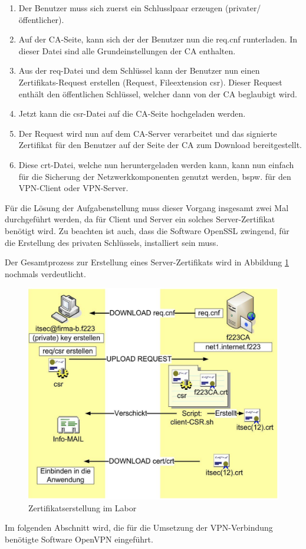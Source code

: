 \documentclass[
a4paper,     %
 headsepline, %
footsepline, %
titlepage,   %
 halfparskip,     %
 fleqn,       %
12pt         %
]{scrartcl}  %
\begin{document}
\begin{enumerate}
\item Der Benutzer muss sich zuerst ein Schlusslpaar erzeugen (privater/öffentlicher)\cite{JueNeuSaDue}.
\item Auf der CA-Seite, kann sich der der Benutzer nun die req.cnf runterladen. In dieser Datei sind alle Grundeinstellungen der CA enthalten\cite{JueNeuSaDue}. 
\item Aus der req-Datei und dem Schlüssel kann der Benutzer nun einen Zertifikats-Request erstellen (Request, Fileextension csr). Dieser Request enthält den öffentlichen Schlüssel, welcher dann von der CA beglaubigt wird\cite{JueNeuSaDue}. 
\item Jetzt kann die csr-Datei auf die CA-Seite hochgeladen werden\cite{JueNeuSaDue}. 
\item Der Request wird nun auf dem CA-Server verarbeitet und das signierte Zertifikat für den Benutzer auf der Seite der CA zum Download bereitgestellt\cite{JueNeuSaDue}. 
\item Diese crt-Datei, welche nun heruntergeladen werden kann, kann nun einfach für die Sicherung der Netzwerkkomponenten genutzt werden, bspw. für den VPN-Client oder VPN-Server\cite{JueNeuSaDue}.  
\end{enumerate}

Für die Lösung der Aufgabenstellung muss dieser Vorgang insgesamt zwei Mal durchgeführt werden, da für Client und Server ein solches Server-Zertifikat benötigt wird. Zu beachten ist auch, dass die Software OpenSSL zwingend, für die Erstellung des privaten Schlüssels, installiert sein muss.

Der Gesamtprozess zur Erstellung eines Server-Zertifikats wird in Abbildung \ref{fig:Zertifikaserstellung} nochmals verdeutlicht.  
\begin{figure}[!h]
	\includegraphics[width=\textwidth]{pictures/Zertifikatserstellung.png}
	\caption{Zertifikatserstellung im Labor\cite{JueNeuSaDue}}
	\label{fig:Zertifikaserstellung}
\end{figure}
\newpage
Im folgenden Abschnitt wird, die für die Umsetzung der VPN-Verbindung benötigte Software OpenVPN eingeführt. 
\newpage
\end{document}
